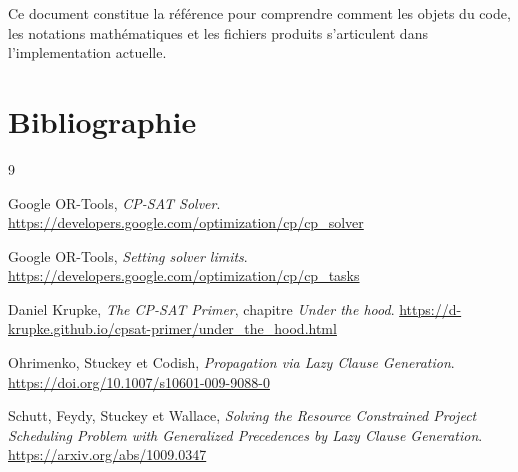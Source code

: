 \documentclass[11pt,a4paper]{article}
\begin{document}
Ce document constitue la référence pour comprendre comment les objets du code, les notations mathématiques et les fichiers produits s'articulent dans l'implementation actuelle.

\section{Bibliographie}

\begin{thebibliography}{9}

Google OR-Tools, \emph{CP-SAT Solver}.
\url{https://developers.google.com/optimization/cp/cp_solver}

Google OR-Tools, \emph{Setting solver limits}.
\url{https://developers.google.com/optimization/cp/cp_tasks}

Daniel Krupke, \emph{The CP-SAT Primer}, chapitre \emph{Under the hood}.
\url{https://d-krupke.github.io/cpsat-primer/under_the_hood.html}

Ohrimenko, Stuckey et Codish, \emph{Propagation via Lazy Clause Generation}.
\url{https://doi.org/10.1007/s10601-009-9088-0}

Schutt, Feydy, Stuckey et Wallace, \emph{Solving the Resource Constrained Project Scheduling Problem with Generalized Precedences by Lazy Clause Generation}.
\url{https://arxiv.org/abs/1009.0347}

\end{thebibliography}
\end{document}
